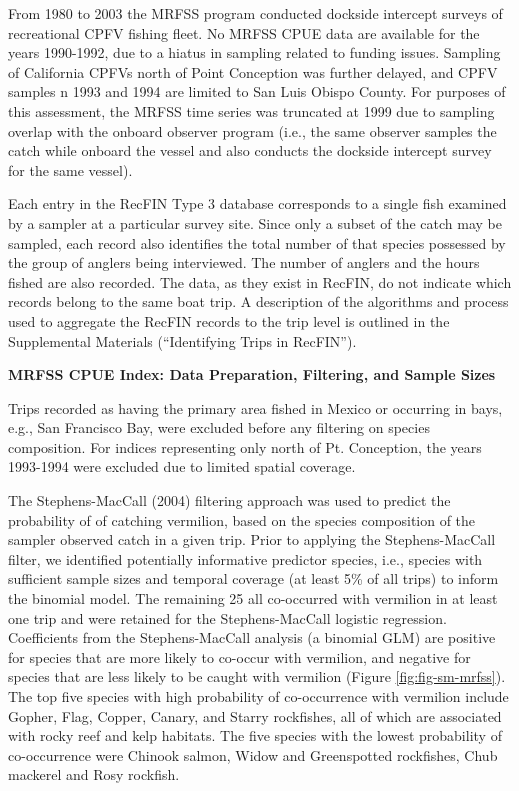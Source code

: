\documentclass[
  english,
  a4paper,
]{article}
\begin{document}
From 1980 to 2003 the MRFSS program conducted dockside intercept surveys of
recreational CPFV fishing fleet. No MRFSS CPUE data are available for the years
1990-1992, due to a hiatus in sampling related to funding issues. Sampling of
California CPFVs north of Point Conception was further delayed, and CPFV samples
n 1993 and 1994 are limited to San Luis Obispo County.
For purposes of this assessment, the MRFSS time series was truncated at 1999 due
to sampling overlap with the
onboard observer program (i.e., the same observer samples the catch while
onboard the vessel and also conducts the dockside intercept survey for
the same vessel).

Each entry in the RecFIN Type 3 database corresponds to a
single fish examined by a sampler at a particular survey site. Since only a
subset of the catch may be sampled, each record also
identifies the total number of that species possessed by the group of anglers
being interviewed. The number of anglers and the hours fished are also recorded.
The data, as they exist in RecFIN, do not indicate which records
belong to the same boat trip. A description of the algorithms and process used to
aggregate the RecFIN records to the trip level is outlined in the Supplemental Materials
(``Identifying Trips in RecFIN'').

\textbf{MRFSS CPUE Index: Data Preparation, Filtering, and Sample Sizes}

Trips recorded as having the primary area fished in Mexico or occurring in bays, e.g.,
San Francisco Bay, were excluded before any filtering on species composition.
For indices representing only north of Pt. Conception, the years 1993-1994 were
excluded due to limited spatial coverage.

The Stephens-MacCall (2004) filtering approach was used to predict the
probability of of catching vermilion, based
on the species composition of the sampler observed catch in a given trip. Prior
to applying the Stephens-MacCall filter, we identified potentially informative
predictor species, i.e., species with sufficient sample sizes and temporal coverage
(at least 5\% of all trips) to inform the binomial model. The remaining
25 all co-occurred with vermilion in at least one trip
and were retained for the Stephens-MacCall logistic regression. Coefficients
from the Stephens-MacCall analysis (a binomial GLM) are positive
for species that are more likely to co-occur with vermilion,
and negative for species that are less likely to be caught with vermilion
(Figure \ref{fig:fig-sm-mrfss}).
The top five species with high probability of co-occurrence with vermilion include
Gopher, Flag, Copper, Canary, and Starry rockfishes, all of which are associated with rocky reef and kelp
habitats. The five species with the lowest probability of co-occurrence were
Chinook salmon, Widow and Greenspotted rockfishes, Chub mackerel and Rosy rockfish.
\end{document}
